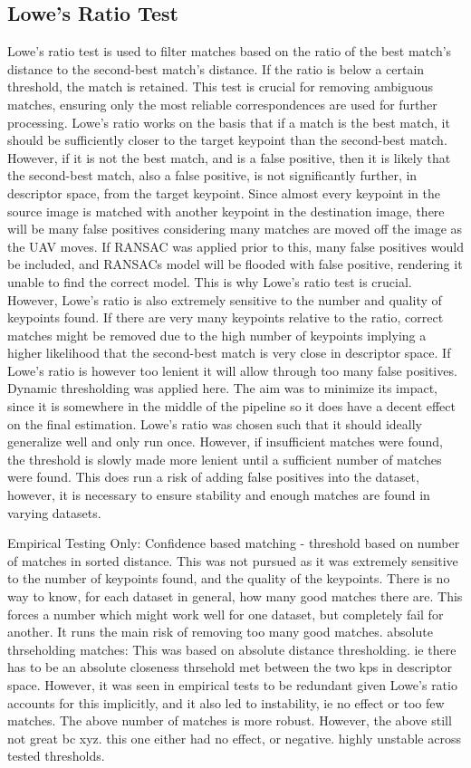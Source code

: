 \subsection*{Lowe's Ratio Test}
Lowe's ratio test is used to filter matches based on the ratio of the best match's distance to the second-best match's distance. If the ratio is below a certain threshold, the match is retained. This test is crucial for removing ambiguous matches, ensuring only the most reliable correspondences are used for further processing. Lowe's ratio works on the basis that if a match is the best match, it should be sufficiently closer to the target keypoint than the second-best match. However, if it is not the best match, and is a false positive, then it is likely that the second-best match, also a false positive, is not significantly further, in descriptor space, from the target keypoint. Since almost every keypoint in the source image is matched with another keypoint in the destination image, there will be many false positives considering many matches are moved off the image as the UAV moves. If RANSAC was applied prior to this, many false positives would be included, and RANSACs model will be flooded with false positive, rendering it unable to find the correct model. This is why Lowe's ratio test is crucial. However, Lowe's ratio is also extremely sensitive to the number and quality of keypoints found. If there are very many keypoints relative to the ratio, correct matches might be removed due to the high number of keypoints implying a higher likelihood that the second-best match is very close in descriptor space. If Lowe's ratio is however too lenient it will allow through too many false positives. Dynamic thresholding was applied here. The aim was to minimize its impact, since it is somewhere in the middle of the pipeline so it does have a decent effect on the final estimation. Lowe's ratio was chosen such that it should ideally generalize well and only run once. However, if insufficient matches were found, the threshold is slowly made more lenient until a sufficient number of matches were found. This does run a risk of adding false positives into the dataset, however, it is necessary to ensure stability and enough matches are found in varying datasets. 


Empirical Testing Only:
Confidence based matching - threshold based on number of matches in sorted distance. This was not pursued as it was extremely sensitive to the number of keypoints found, and the quality of the keypoints. There is no way to know, for each dataset in general, how many good matches there are. This forces a number which might work well for one dataset, but completely fail for another. It runs the main risk of removing too many good matches.
absolute thrseholding matches: This was based on absolute distance thresholding. ie there has to be an absolute closeness thrsehold met between the two kps in descriptor space. However, it was seen in empirical tests to be redundant given Lowe's ratio accounts for this implicitly, and it also led to instability, ie no effect or too few matches. The above number of matches is more robust. However, the above still not great bc xyz. this one either had no effect, or negative. highly unstable across tested thresholds. 




